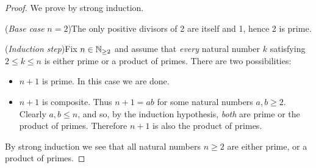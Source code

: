\begin{proof}
	We prove by strong induction.\par
	(\emph{Base case} $n=2$)\quad The only positive divisors of 2 are itself and 1, hence 2 is prime.\par
	(\emph{Induction step})\quad Fix $n\in\mathbb{N}_{\ge 2}$ and assume that \emph{every} natural number $k$ satisfying $2\le k\le n$ is either prime or a product of primes. There are two possibilities:
	\begin{itemize}
	  \item $n+1$ is prime. In this case we are done.
	  \item $n+1$ is composite. Thus $n+1=ab$ for some natural numbers $a,b\ge 2$. Clearly $a,b\le n$, and so, by the induction hypothesis, \emph{both} are prime or the product of primes. Therefore $n+1$ is also the product of primes.
	\end{itemize}
	By strong induction we see that all natural numbers $n\ge 2$ are either prime, or a product of primes.
\end{proof}
% 
% 

